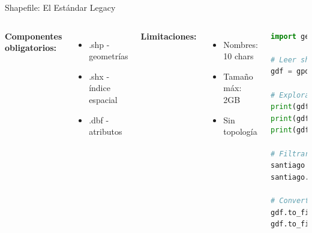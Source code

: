 \documentclass[10pt,aspectratio=169]{beamer}
\begin{document}
\begin{frame}[fragile]{Shapefile: El Estándar Legacy}
    \begin{columns}[T]
        \footnotesize
        \textbf{Componentes obligatorios:}
        \begin{itemize}
            \item .shp - geometrías
            \item .shx - índice espacial
            \item .dbf - atributos
        \end{itemize}
        
        \textbf{Limitaciones:}
        \begin{itemize}
            \item Nombres: 10 chars
            \item Tamaño máx: 2GB
            \item Sin topología
        \end{itemize}
        
        \begin{lstlisting}[language=Python]
import geopandas as gpd

# Leer shapefile
gdf = gpd.read_file('comunas.shp')

# Explorar estructura
print(gdf.head())
print(gdf.crs)
print(gdf.geometry.type.unique())

# Filtrar y guardar
santiago = gdf[gdf['COMUNA'] == 'Santiago']
santiago.to_file('santiago.shp')

# Convertir a otros formatos
gdf.to_file('comunas.geojson', driver='GeoJSON')
gdf.to_file('comunas.gpkg', driver='GPKG')
        \end{lstlisting}
    \end{columns}
\end{frame}
\end{document}
